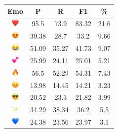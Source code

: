 \documentclass{article}
\begin{document}
\begin{table}
\centering
\begin{tabular}{|c|ccc|c|} \hline
\textbf{Emo} & \textbf{P} & \textbf{R} & \textbf{F1} & \textbf{\%} \\ \hline
\includegraphics[height=0.37cm,width=0.37cm]{img/red_heart.png} & 95.5 & 73.9 & 83.32 & 21.6\\ 
\includegraphics[height=0.37cm,width=0.37cm]{img/smiling_face_with_hearteyes.png} & 39.38 & 28.7 & 33.2 & 9.66\\ 
\includegraphics[height=0.37cm,width=0.37cm]{img/face_with_tears_of_joy.png} & 51.09 & 35.27 & 41.73 & 9.07\\ 
\includegraphics[height=0.37cm,width=0.37cm]{img/two_hearts.png} & 25.99 & 24.11 & 25.01 & 5.21\\ 
\includegraphics[height=0.37cm,width=0.37cm]{img/fire.png} & 56.5 & 52.29 & 54.31 & 7.43\\ 
\includegraphics[height=0.37cm,width=0.37cm]{img/smiling_face_with_smiling_eyes.png} & 13.98 & 14.45 & 14.21 & 3.23\\ 
\includegraphics[height=0.37cm,width=0.37cm]{img/smiling_face_with_sunglasses.png} & 20.52 & 23.3 & 21.82 & 3.99\\ 
\includegraphics[height=0.37cm,width=0.37cm]{img/sparkles.png} & 34.29 & 38.34 & 36.2 & 5.5\\ 
\includegraphics[height=0.37cm,width=0.37cm]{img/blue_heart.png} & 24.38 & 23.56 & 23.97 & 3.1\\ 

\end{tabular}
\end{table}
\end{document}
